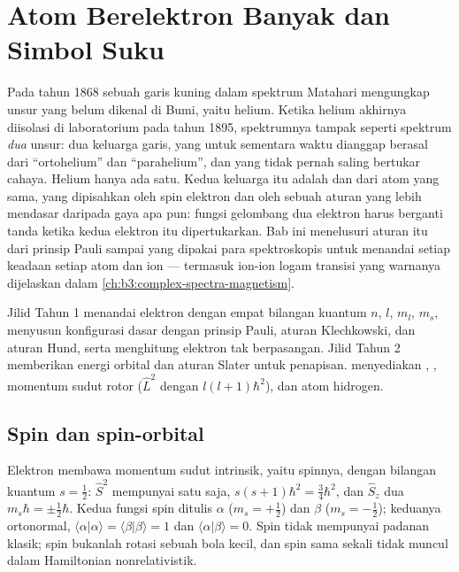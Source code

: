 \chapter{Atom Berelektron Banyak dan Simbol Suku}\label{ch:b3:many-electron-atoms}

Pada tahun 1868 sebuah garis kuning dalam spektrum Matahari mengungkap
unsur yang belum dikenal di Bumi, yaitu helium. Ketika helium akhirnya
diisolasi di laboratorium pada tahun 1895, spektrumnya tampak seperti
spektrum \emph{dua} unsur: dua keluarga garis, yang untuk sementara waktu
dianggap berasal dari ``ortohelium'' dan ``parahelium'', dan yang tidak
pernah saling bertukar cahaya. Helium hanya ada satu. Kedua keluarga itu
adalah  dan  dari atom yang sama, yang
dipisahkan oleh spin elektron dan oleh sebuah aturan yang lebih mendasar
daripada gaya apa pun: fungsi gelombang dua elektron harus berganti tanda
ketika kedua elektron itu dipertukarkan. Bab ini menelusuri aturan itu dari
prinsip Pauli sampai  yang dipakai para spektroskopis untuk
menandai setiap keadaan setiap atom dan ion --- termasuk ion-ion logam
transisi yang warnanya dijelaskan dalam \cref{ch:b3:complex-spectra-magnetism}.

\begin{recall}
Jilid Tahun 1 menandai elektron dengan empat bilangan kuantum $n$, $l$,
$m_l$, $m_s$, menyusun konfigurasi dasar dengan prinsip Pauli, aturan
Klechkowski, dan aturan Hund, serta menghitung elektron tak berpasangan.
Jilid Tahun 2 memberikan energi orbital dan aturan Slater untuk penapisan.
 menyediakan , , momentum
sudut rotor ($\hat L^2$ dengan  $l(l+1)\hbar^2$), dan atom hidrogen.
\end{recall}

\section{Spin dan spin-orbital}

Elektron membawa momentum sudut intrinsik, yaitu spinnya, dengan bilangan
kuantum $s = \frac12$: $\hat S^2$ mempunyai satu  saja, $s(s+1)\hbar^2 =
\frac34\hbar^2$, dan $\hat S_z$ dua  $m_s\hbar = \pm\frac12\hbar$.
Kedua fungsi spin ditulis $\alpha$ ($m_s = +\frac12$) dan $\beta$
($m_s = -\frac12$); keduanya ortonormal, $\langle\alpha|\alpha\rangle =
\langle\beta|\beta\rangle = 1$ dan $\langle\alpha|\beta\rangle = 0$. Spin tidak
mempunyai padanan klasik; spin bukanlah rotasi sebuah bola kecil, dan spin
sama sekali tidak muncul dalam Hamiltonian nonrelativistik.

